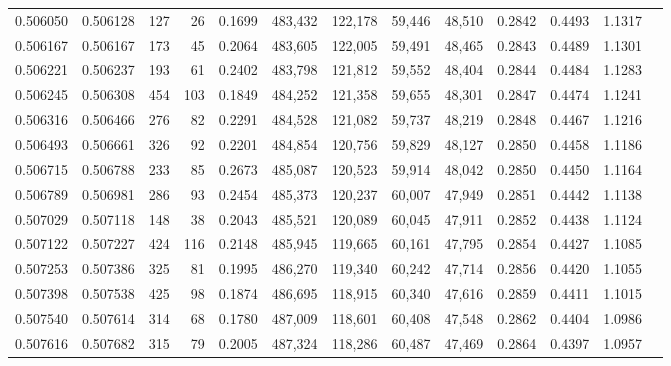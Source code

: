 \begin{tabular}{rrrrrrrrrrrrr}
0.506050 & 0.506128 &   127 &    26 &                                     0.1699 & 483,432 & 122,178 &  59,446 &  48,510 & 0.2842 & 0.4493 & 1.1317 \\
0.506167 & 0.506167 &   173 &    45 &                                     0.2064 & 483,605 & 122,005 &  59,491 &  48,465 & 0.2843 & 0.4489 & 1.1301 \\
0.506221 & 0.506237 &   193 &    61 &                                     0.2402 & 483,798 & 121,812 &  59,552 &  48,404 & 0.2844 & 0.4484 & 1.1283 \\
0.506245 & 0.506308 &   454 &   103 &                                     0.1849 & 484,252 & 121,358 &  59,655 &  48,301 & 0.2847 & 0.4474 & 1.1241 \\
0.506316 & 0.506466 &   276 &    82 &                                     0.2291 & 484,528 & 121,082 &  59,737 &  48,219 & 0.2848 & 0.4467 & 1.1216 \\
0.506493 & 0.506661 &   326 &    92 &                                     0.2201 & 484,854 & 120,756 &  59,829 &  48,127 & 0.2850 & 0.4458 & 1.1186 \\
0.506715 & 0.506788 &   233 &    85 &                                     0.2673 & 485,087 & 120,523 &  59,914 &  48,042 & 0.2850 & 0.4450 & 1.1164 \\
0.506789 & 0.506981 &   286 &    93 &                                     0.2454 & 485,373 & 120,237 &  60,007 &  47,949 & 0.2851 & 0.4442 & 1.1138 \\
0.507029 & 0.507118 &   148 &    38 &                                     0.2043 & 485,521 & 120,089 &  60,045 &  47,911 & 0.2852 & 0.4438 & 1.1124 \\
0.507122 & 0.507227 &   424 &   116 &                                     0.2148 & 485,945 & 119,665 &  60,161 &  47,795 & 0.2854 & 0.4427 & 1.1085 \\
0.507253 & 0.507386 &   325 &    81 &                                     0.1995 & 486,270 & 119,340 &  60,242 &  47,714 & 0.2856 & 0.4420 & 1.1055 \\
0.507398 & 0.507538 &   425 &    98 &                                     0.1874 & 486,695 & 118,915 &  60,340 &  47,616 & 0.2859 & 0.4411 & 1.1015 \\
0.507540 & 0.507614 &   314 &    68 &                                     0.1780 & 487,009 & 118,601 &  60,408 &  47,548 & 0.2862 & 0.4404 & 1.0986 \\
0.507616 & 0.507682 &   315 &    79 &                                     0.2005 & 487,324 & 118,286 &  60,487 &  47,469 & 0.2864 & 0.4397 & 1.0957 \\

\end{tabular}

